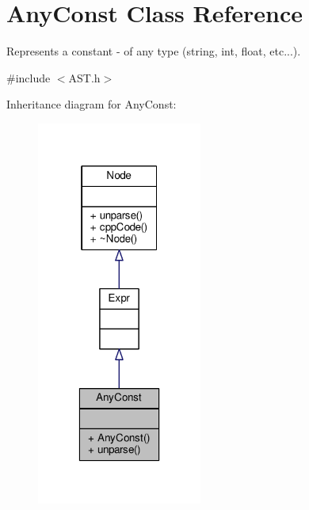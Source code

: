 \hypertarget{classAnyConst}{\section{Any\-Const Class Reference}
\label{classAnyConst}
}


Represents a constant -\/ of any type (string, int, float, etc...). \par
  




{\ttfamily \#include $<$A\-S\-T.\-h$>$}



Inheritance diagram for Any\-Const\-:\nopagebreak
\begin{figure}[H]
\begin{center}
\leavevmode
\includegraphics[width=154pt]{classAnyConst__inherit__graph}
\end{center}
\end{figure}


